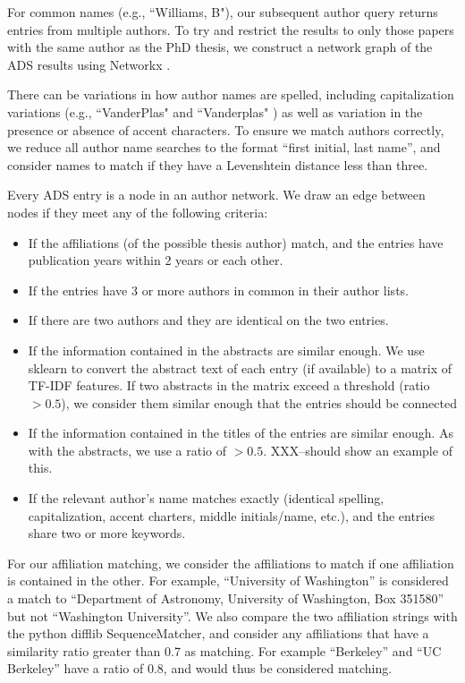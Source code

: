 \documentclass[preprint2]{aastex}
\begin{document}
For common names (e.g.,  ``Williams, B"), our subsequent author query returns entries from multiple authors.  To try and restrict the results to only those papers with the same author as the PhD thesis, we construct a network graph of the ADS results using Networkx \citet{networkx}.

There can be variations in how author names are spelled, including capitalization variations (e.g., ``VanderPlas" \citep{VanderPlas12} and ``Vanderplas" \citep{van12}) as well as variation in the presence or absence of accent characters.  To ensure we match authors correctly, we reduce all author name searches to the format ``first initial, last name'', and consider names to match if they have a Levenshtein distance less than three.

Every ADS entry is a node in an author network. We draw an edge between nodes if they meet any of the following criteria:

\begin{itemize}
\item{If the affiliations (of the possible thesis author) match, and the entries have publication years within 2 years or each other.}
\item{If the entries have 3 or more authors in common in their author lists.}
\item{If there are two authors and they are identical on the two entries.}
\item{If the information contained in the abstracts are similar enough.  We use sklearn \citet{scikit-learn} to convert the abstract text of each entry (if available) to a matrix of TF-IDF features.  If two abstracts in the matrix exceed a threshold (ratio $> 0.5$), we consider them similar enough that the entries should be connected}
\item{If the information contained in the titles of the entries are similar enough.  As with the abstracts, we use a ratio of $>0.5$. XXX--should show an example of this.}
\item{If the relevant author's name matches exactly (identical spelling, capitalization, accent charters, middle initials/name, etc.), and the entries share two or more keywords.}
\end{itemize}

For our affiliation matching, we consider the affiliations to match if one affiliation is contained in the other.  For example, ``University of Washington'' is considered a match to ``Department of Astronomy, University of Washington, Box 351580'' but not ``Washington University''.  We also compare the two affiliation strings with the python difflib SequenceMatcher, and consider any affiliations that have a similarity ratio greater than 0.7 as matching.  For example ``Berkeley'' and ``UC Berkeley'' have a ratio of 0.8, and would thus be considered matching.
\end{document}
